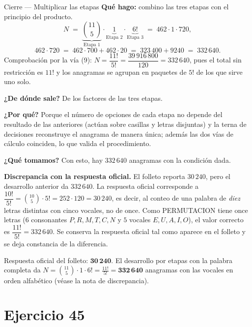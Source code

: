 \documentclass[11pt]{article}
\begin{document}
\begin{paso}{Cierre --- Multiplicar las etapas}
\textbf{Qu\'e hago:} combino las tres etapas con el principio del producto.
\[
N\;=\;\underbrace{\binom{11}{5}}_{\text{Etapa 1}}\cdot\underbrace{1}_{\text{Etapa 2}}\cdot\underbrace{6!}_{\text{Etapa 3}}
\;=\;462\cdot 1\cdot 720 ,
\]
\[
462\cdot 720\;=\;462\cdot 700+462\cdot 20\;=\;323\,400+9240\;=\;332\,640 .
\]
Comprobaci\'on por la v\'ia (9): $N=\dfrac{11!}{5!}=\dfrac{39\,916\,800}{120}=332\,640$, pues el total sin
restricci\'on es $11!$ y los anagramas se agrupan en paquetes de $5!$ de los que sirve uno solo.

\textbf{¿De d\'onde sale?} De los factores de las tres etapas.

\textbf{¿Por qu\'e?} Porque el n\'umero de opciones de cada etapa no depende del resultado de las anteriores
(actúan sobre casillas y letras disjuntas) y la terna de decisiones reconstruye el anagrama de manera
\'unica; adem\'as las dos v\'ias de c\'alculo coinciden, lo que valida el procedimiento.

\textbf{¿Qu\'e tomamos?} Con esto, hay $332\,640$ anagramas con la condici\'on dada.
\end{paso}

\begin{nota}
\textbf{Discrepancia con la respuesta oficial.} El folleto reporta $30\,240$, pero el desarrollo anterior da
$332\,640$. La respuesta oficial corresponde a $\dfrac{10!}{5!}=\binom{10}{5}\cdot 5!=252\cdot 120=30\,240$,
es decir, al conteo de una palabra de \emph{diez} letras distintas con cinco vocales, no de once. Como
PERMUTACION tiene once letras ($6$ consonantes $P,R,M,T,C,N$ y $5$ vocales $E,U,A,I,O$), el valor correcto
es $\dfrac{11!}{5!}=332\,640$. Se conserva la respuesta oficial tal como aparece en el folleto y se deja
constancia de la diferencia.
\end{nota}

\begin{resp}
Respuesta oficial del folleto: $\mathbf{30\,240}$. El desarrollo por etapas con la palabra completa da
$\displaystyle N=\binom{11}{5}\cdot 1\cdot 6!=\frac{11!}{5!}=\mathbf{332\,640}$ anagramas con las vocales en
orden alfab\'etico (v\'ease la nota de discrepancia).
\end{resp}

\section*{Ejercicio 45}
\end{document}
